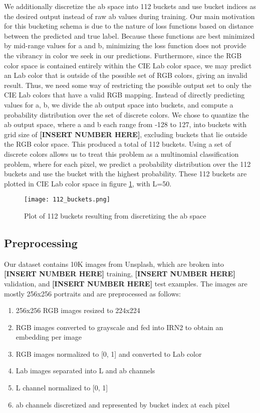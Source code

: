 \documentclass{article} %
\begin{document}
We additionally discretize the ab space into 112 buckets and use bucket indices as the desired output instead of raw ab values during training. Our main motivation for this bucketing schema is due to the nature of loss functions based on distance between the predicted and true label. Because these functions are best minimized by mid-range values for a and b, minimizing the loss function does not provide the vibrancy in color we seek in our predictions. Furthermore, since the RGB color space is contained entirely within the CIE Lab color space, we may predict an Lab color that is outside of the possible set of RGB colors, giving an invalid result. Thus, we need some way of restricting the possible output set to only the CIE Lab colors that have a valid RGB mapping. Instead of directly predicting values for a, b, we divide the ab output space into buckets, and compute a probability distribution over the set of discrete colors. We chose to quantize the ab output space, where a and b each range from -128 to 127, into buckets with grid size of \textbf{[INSERT NUMBER HERE]}, excluding buckets that lie outside the RGB color space. This produced a total of 112 buckets. Using a set of discrete colors allows us to treat this problem as a multinomial classification problem, where for each pixel, we predict a probability distribution over the 112 buckets and use the bucket with the highest probability. These 112 buckets are plotted in CIE Lab color space in figure \ref{fig:buckets}, with L=50.

\begin{figure}[h]
  \centering
    \texttt{[image: 112\_buckets.png]}
  \caption{Plot of 112 buckets resulting from discretizing the ab space}
  \label{fig:buckets}
\end{figure}

\subsection{Preprocessing}

Our dataset contains 10K images from Unsplash\cite{dataset}, which are broken into \textbf{[INSERT NUMBER HERE]} training, \textbf{[INSERT NUMBER HERE]} validation, and \textbf{[INSERT NUMBER HERE]} test examples. The images are mostly 256x256 portraits and are preprocessed as follows:

\begin{enumerate}
    \item 256x256 RGB images resized to 224x224
    \item RGB images converted to grayscale and fed into IRN2 to obtain an embedding per image
    \item RGB images normalized to [0, 1] and converted to Lab color
    \item Lab images separated into L and ab channels
    \item L channel normalized to [0, 1]
    \item ab channels discretized and represented by bucket index at each pixel
\end{enumerate}
\end{document}
